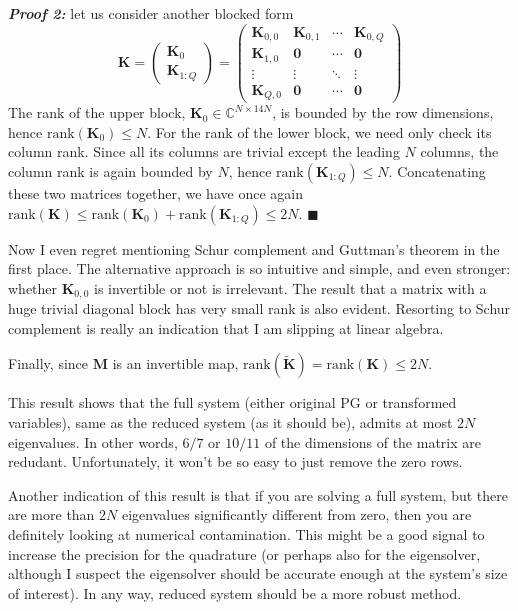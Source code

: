 \noindent\textit{\textbf{Proof 2:}} let us consider another blocked form
\[
    \mathbf{K} = \begin{pmatrix}
        \mathbf{K}_0 \\ 
        \mathbf{K}_{1:Q}
    \end{pmatrix} = \left(\begin{array}{cccc}
        \mathbf{K}_{0,0} & \mathbf{K}_{0,1} & \cdots & \mathbf{K}_{0,Q} \\ 
        \hline
        \mathbf{K}_{1,0} & \mathbf{0} & \cdots & \mathbf{0} \\
        \vdots & \vdots & \ddots & \vdots \\ 
        \mathbf{K}_{Q,0} & \mathbf{0} & \cdots & \mathbf{0}
    \end{array}\right)
\]
The rank of the upper block, $\mathbf{K}_0\in \mathbb{C}^{N\times 14N}$, is bounded by the row dimensions, hence $\mathrm{rank}(\mathbf{K}_0) \leq N$.
For the rank of the lower block, we need only check its column rank. Since all its columns are trivial except the leading $N$ columns, the column rank is again bounded by $N$, hence $\mathrm{rank}(\mathbf{K}_{1:Q})\leq N$. Concatenating these two matrices together, we have once again $\mathrm{rank}(\mathbf{K}) \leq \mathrm{rank}(\mathbf{K}_0) + \mathrm{rank}(\mathbf{K}_{1:Q}) \leq 2N$. $\blacksquare$
\medskip

Now I even regret mentioning Schur complement and Guttman's theorem in the first place. The alternative approach is so intuitive and simple, and even stronger: whether $\mathbf{K}_{0,0}$ is invertible or not is irrelevant. The result that a matrix with a huge trivial diagonal block has very small rank is also evident. Resorting to Schur complement is really an indication that I am slipping at linear algebra.

Finally, since $\mathbf{M}$ is an invertible map, $\mathrm{rank}(\widetilde{\mathbf{K}}) = \mathrm{rank}(\mathbf{K}) \leq 2N$.

This result shows that the full system (either original PG or transformed variables), same as the reduced system (as it should be), admits at most $2N$ eigenvalues. In other words, $6/7$ or $10/11$ of the dimensions of the matrix are redudant. Unfortunately, it won't be so easy to just remove the zero rows.

Another indication of this result is that if you are solving a full system, but there are more than $2N$ eigenvalues significantly different from zero, then you are definitely looking at numerical contamination. This might be a good signal to increase the precision for the quadrature (or perhaps also for the eigensolver, although I suspect the eigensolver should be accurate enough at the system's size of interest). In any way, reduced system should be a more robust method.



